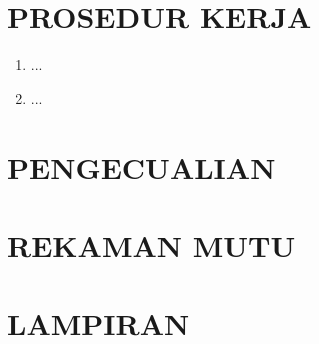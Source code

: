 \documentclass[12pt]{npl.doc}
\begin{document}
    \section{PROSEDUR KERJA}
    \begin{enumerate}
        \item ...
        \item ...
    \end{enumerate}

    \section{PENGECUALIAN}
    \section{REKAMAN MUTU}
    \section{LAMPIRAN}
\end{document}
